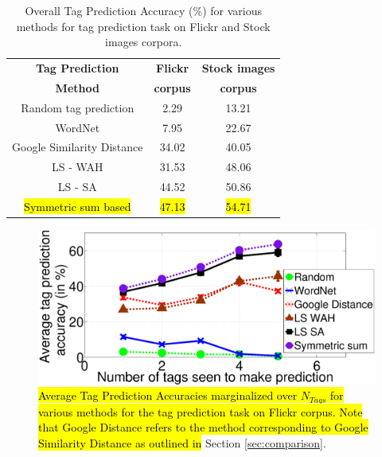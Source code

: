 \begin{table}[htbp]
\fontsize{8pt}{1em}\selectfont
\begin{center}
\caption{Overall Tag Prediction Accuracy (\%) for various methods for tag prediction task on Flickr and Stock images corpora. }
\label{tab:TPFlickr117Summary}
\begin{tabular}{|c|c|c|}
		\hline
		\textbf{Tag Prediction} & \textbf{Flickr} & \textbf{Stock images} \\ 
		\textbf{Method} & \textbf{corpus} & \textbf{corpus}\\ 
		\hline 
		 Random tag prediction   & 2.29  & 13.21 \\
		\hline
		 WordNet  & 7.95  & 22.67 \\
		\hline
		Google Similarity Distance & 34.02 & 40.05\\
		\hline 
		 LS - WAH &  31.53  & 48.06\\
		\hline
		LS - SA &  44.52 & 50.86 \\
		\hline
		\hl{Symmetric sum based} &  \hl{47.13} & \hl{54.71} \\
		\hline
\end{tabular}
\end{center}
\end{table}
\begin{figure}[htbp]
\centering
\includegraphics[width=0.65\linewidth]{TagTree/TPFlickr_rebuttal}
\caption{\hl{Average Tag Prediction Accuracies marginalized over $N_{Tags}$ for various methods for the tag prediction task on Flickr corpus. Note that Google Distance refers to the method corresponding to Google Similarity Distance as outlined in }Section \ref{sec:comparison}.} 
\label{fig:FWS117TagPredGraph}
\end{figure}
